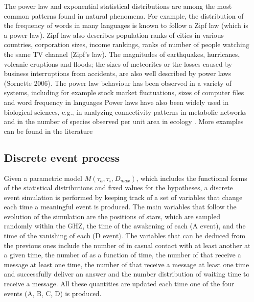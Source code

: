 The power law and exponential statistical distributions are among the
most common patterns found in natural phenomena.
%
For example, the distribution of the frequency of words in many
languages is known to follow a Zipf law (which is a power law).
%
Zipf law also describes population ranks of cities in various
countries, corporation sizes, income rankings, ranks of number of
people watching the same TV channel (Zipf's law).
%
%
The magnitudes of earthquakes, hurricanes, volcanic eruptions and
floods; the sizes of meteorites or the losses caused by business
interruptions from accidents, are also well described by power laws
(Sornette 2006).
%
The power law behaviour has been observed in a variety of systems,
including for example stock market fluctuations, sizes of computer
files and word frequency in languages \citep{mitzenmacher_brief_2004,
newman_power_2005, simkin_theory_2006}
%
Power laws have also been widely used in biological sciences, e.g., in
analyzing connectivity patterns in metabolic networks
\citep{jeong_large_2000} and in the number of species observed per
unit area in ecology \citep{martin_origin_2006, frank_common_2009}.
% 
More examples can be found in the literature
\citep{martin_origin_2006, maccone_KLT_2010, barabasi_scale_2009,
maccone_evolution_2014, maccone_lognormals_2014,
benguigui_classificacion_2016}
 

\subsection{Discrete event process}

Given a parametric model $M(\tau_a, \tau_s, D_{max})$, which includes
the functional forms of the statistical distributions and fixed values
for the hypotheses, a discrete event simulation is performed by
keeping track of a set of variables that change each time a meaningful
event is produced.
%
The main variables that follow the evolution of the simulation are the
positions of stars, which are sampled randomly within the GHZ, the
time of the awakening of each \ceti (A event), and the time of the
vanishing of each \ceti (D event).
%
The variables that can be deduced from the previous ones include the
number of \cetis in casual contact with at least another \ceti at a given
time, the number of \cetis as a function of time, the number of \cetis
that receive a message at least one time, the number of \cetis that
receive a message at least one time and successfully deliver an answer
and the number distribution of waiting time to receive a message.
%
All these quantities are updated each time one of the four events (A,
B, C, D) is produced.
          
